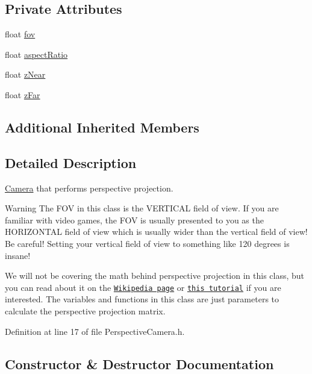 \subsection*{Private Attributes}
\begin{DoxyCompactItemize}
\item 
float \hyperlink{class_perspective_camera_ad693187f75ab5bfc597066364483325c}{fov}
\item 
float \hyperlink{class_perspective_camera_ad96660d3109e54fa282955bf66a255eb}{aspect\+Ratio}
\item 
float \hyperlink{class_perspective_camera_a11c1dcd1bdeb4bf8294d6272fb4d2695}{z\+Near}
\item 
float \hyperlink{class_perspective_camera_af88e6161cd3c818d49e6421f52474a2b}{z\+Far}
\end{DoxyCompactItemize}
\subsection*{Additional Inherited Members}


\subsection{Detailed Description}
\hyperlink{class_camera}{Camera} that performs perspective projection. 

\begin{DoxyWarning}{Warning}
The F\+O\+V in this class is the V\+E\+R\+T\+I\+C\+A\+L field of view. If you are familiar with video games, the F\+O\+V is usually presented to you as the H\+O\+R\+I\+Z\+O\+N\+T\+A\+L field of view which is usually wider than the vertical field of view! Be careful! Setting your vertical field of view to something like 120 degrees is insane!
\end{DoxyWarning}
We will not be covering the math behind perspective projection in this class, but you can read about it on the \href{https://en.wikipedia.org/wiki/3D_projection#Perspective_projection}{\tt Wikipedia page} or \href{http://ogldev.atspace.co.uk/www/tutorial12/tutorial12.html}{\tt this tutorial} if you are interested. The variables and functions in this class are just parameters to calculate the perspective projection matrix. 

Definition at line 17 of file Perspective\+Camera.\+h.



\subsection{Constructor \& Destructor Documentation}
\hypertarget{class_perspective_camera_adb5624bfee18c9390df3ba0612431124}{}
